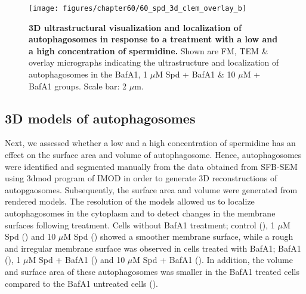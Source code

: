 \begin{landscape}
\begin{figure}[!htbp]
\center
  \texttt{[image: figures/chapter60/60\_spd\_3d\_clem\_overlay\_b]}
  \caption[3D ultrastructural visualization and localization of autophagosomes in response to a treatment with a low and a high concentration of spermidine]{\textbf{3D ultrastructural visualization and localization of autophagosomes in response to a treatment with a low and a high concentration of spermidine.} Shown are FM, TEM \& overlay micrographs indicating the ultrastructure and localization of autophagosomes in the BafA1, 1 $\mu$M Spd + BafA1 \& 10 $\mu$M + BafA1 groups. Scale bar: 2 $\mu$m.}
  \label{fig:60_spd_3d_clem_overlay_b}
\end{figure} 
\end{landscape}

\subsection{3D models of autophagosomes}
Next, we assessed whether a low and a high concentration of spermidine has an effect on the surface area and volume of autophagosome.  Hence, autophagosomes were identified and segmented manually from the data obtained from SFB-SEM using 3dmod program of IMOD \citep{Kremer1996} in order to generate  3D reconstructions of autopgaosomes. Subsequently, the surface area and volume were generated from rendered models. The resolution of the models allowed us to localize autophagosomes in the cytoplasm and to detect changes in the membrane surfaces following treatment. Cells without BafA1 treatment; control (), 1 $\mu$M Spd () and 10 $\mu$M Spd () showed a smoother membrane surface, while a rough and irregular membrane surface was observed in cells treated with BafA1; BafA1 (), 1 $\mu$M Spd + BafA1 () and 10 $\mu$M Spd + BafA1 (). In addition, the volume and surface area of these autophagosomes was smaller  in the BafA1 treated cells compared to the BafA1 untreated cells ().

